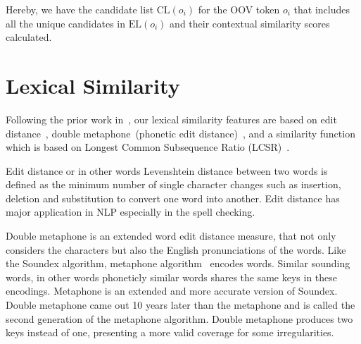 \documentclass[a4paper,onesided,12pt]{report}
\begin{document}
Hereby, we have the candidate list $\text{CL}(o_{i})$ for the OOV token $o_i$ that includes all the unique candidates in $\text{EL}(o_{i})$ and their contextual similarity scores calculated.

\section{Lexical Similarity}
\label{sec:lexsim}

Following the prior work in~\cite{Han:2011:LNS:2002472.2002520,DBLP:conf/acl/HassanM13}, our lexical similarity features are based on edit distance~\cite{levenshtein1966bcc}, double metaphone~(phonetic edit distance)~\cite{Philips:2000:DMS:349124.349132}, and a similarity function~\cite{Contractor:2010:UCN:1944566.1944588} which is based on Longest Common Subsequence Ratio (LCSR)~\cite{melamed1999bitext}.

Edit distance or in other words Levenshtein distance between two words is defined as the minimum number of single character changes such as insertion, deletion and substitution to convert one word into another. Edit distance has major application in NLP especially in the spell checking.

Double metaphone is an extended word edit distance measure, that not only considers the characters but also the English pronunciations of the words. Like the Soundex algorithm, metaphone algorithm~\cite{philips1990hanging} encodes words. Similar sounding words, in other words phoneticly similar words shares the same keys in these encodings. Metaphone is an extended and more accurate version of Soundex. Double metaphone came out 10 years later than the metaphone and is called the second generation of the metaphone algorithm. Double metaphone produces two keys instead of one, presenting a more valid coverage for some irregularities. %
\end{document}
